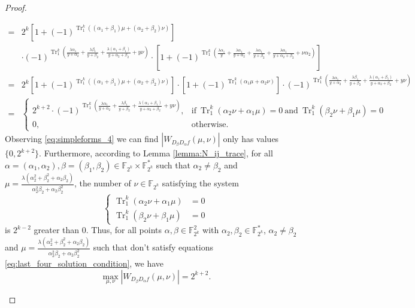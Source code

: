 \documentclass{article}
\newcommand{\F}{\mathbb{F}}
\newcommand{\0}{\textbf{0}}
\newcommand{\1}{\textbf{1}}
\newcommand{\TRACE}{\operatorname{Tr}_1^k}
\theoremstyle{plain}
\begin{document}
\begin{proof}
\begin{enumerate}[label=\textbf{Case \arabic*},wide = 0pt]
\begin{enumerate}[label=\textbf{Subcase \Alph{*}},itemindent=*,wide=\parindent]
\begin{align}
        =&2^k\left[1+(-1)^{\TRACE\left((\alpha_1+\beta_1)\mu+ (\alpha_2+\beta_2)\nu\right)}\right]\nonumber\\
        &\cdot
        (-1)^{\TRACE\left(\frac{\lambda\alpha_1}{y+\alpha_2}+\frac{\lambda\beta_1}{y+\beta_2}+\frac{\lambda(\alpha_1+\beta_1)}{y+\alpha_2+\beta_2}+ y\nu\right)}\cdot
        \left[1+(-1)^{\TRACE\left(\frac{\lambda\alpha_1}{y}+\frac{\lambda\alpha_1}{y+\alpha_2}+\frac{\lambda\alpha_1}{y+\beta_2}+\frac{\lambda\alpha_1}{y+\alpha_2+\beta_2}+\nu\alpha_2\right)}\right]\nonumber\\
        =&2^k\left[1+(-1)^{\TRACE\left((\alpha_1+\beta_1)\mu+ (\alpha_2+\beta_2)\nu\right)}\right]\cdot
        \left[1+(-1)^{\TRACE\left(\alpha_1\mu+\alpha_2\nu\right)}\right]\cdot
        (-1)^{\TRACE\left(\frac{\lambda\alpha_1}{y+\alpha_2}+\frac{\lambda\beta_1}{y+\beta_2}+\frac{\lambda(\alpha_1+\beta_1)}{y+\alpha_2+\beta_2}+ y\nu\right)}\nonumber\\
        =&\begin{cases}
            2^{k+2}\cdot(-1)^{\TRACE\left(\frac{\lambda\alpha_1}{y+\alpha_2}+\frac{\lambda\beta_1}{y+\beta_2}+\frac{\lambda(\alpha_1+\beta_1)}{y+\alpha_2+\beta_2}+ y\nu\right)},&\text{if}~\TRACE\left(\alpha_2\nu+\alpha_1\mu\right)=0 ~
            \text{and}~\TRACE\left(\beta_2\nu+\beta_1 \mu\right)=0 \\
            0,~&\text{otherwise}.
        \end{cases}
    \end{align}
    Observing \eqref{eq:simpleforms_4} we can find $ |W_{D_{\beta}D_{\alpha}f}(\mu,\nu)| $ only 
    has values $ \{0,2^{k+2}\} $. 
    Furthermore, according to Lemma \ref{lemma:N_ij_trace}, 
    for all $ \alpha=(\alpha_1,\alpha_2),\beta=(\beta_1,\beta_2)\in\F_{2^k}\times\F_{2^k}^* $ such that 
    $ \alpha_2\ne\beta_2 $ and $ \mu=\frac{\lambda(\alpha_2^2+\beta_2^2+\alpha_2\beta_2)}{\alpha_2^2\beta_2+\alpha_2\beta_2^2} $, 
    the number of $ \nu\in\F_{2^k} $ satisfying the system
    \begin{equation}\label{eq:max_foursolution_condition}\left\{
        \begin{alignedat}{2}
            \TRACE\left(\alpha_2\nu+\alpha_1\mu\right)&=0\\
            \TRACE\left(\beta_2\nu +\beta_1 \mu\right)&=0
        \end{alignedat}\right.
    \end{equation}
    is $ 2^{k-2} $ greater than $ 0 $.  
    Thus, for all points $ \alpha,\beta\in\F_{2^k}^2 $ with $ \alpha_2,\beta_2\in\F_{2^k}^* $, $ \alpha_2\ne\beta_2 $ 
    and $ \mu=\frac{\lambda(\alpha_2^2+\beta_2^2+\alpha_2\beta_2)}{\alpha_2^2\beta_2+\alpha_2\beta_2^2} $ 
    such that don't satisfy equations \eqref{eq:last_four_solution_condition}, we have 
    \[\max_{\mu,\nu}|W_{D_{\beta}D_{\alpha}f}(\mu,\nu)|=2^{k+2}.\]
    

\end{enumerate}
\end{enumerate}
\end{proof}
\end{document}
